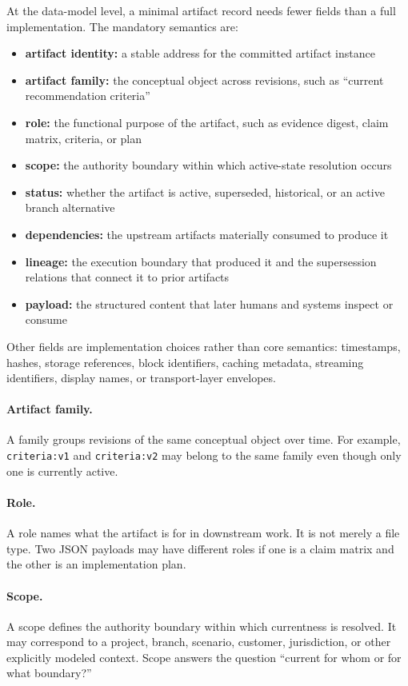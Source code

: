 \documentclass{article}
\begin{document}
At the data-model level, a minimal artifact record needs fewer fields than a full implementation. The mandatory semantics are:
\begin{itemize}
\item \textbf{artifact identity:} a stable address for the committed artifact instance
\item \textbf{artifact family:} the conceptual object across revisions, such as ``current recommendation criteria''
\item \textbf{role:} the functional purpose of the artifact, such as evidence digest, claim matrix, criteria, or plan
\item \textbf{scope:} the authority boundary within which active-state resolution occurs
\item \textbf{status:} whether the artifact is active, superseded, historical, or an active branch alternative
\item \textbf{dependencies:} the upstream artifacts materially consumed to produce it
\item \textbf{lineage:} the execution boundary that produced it and the supersession relations that connect it to prior artifacts
\item \textbf{payload:} the structured content that later humans and systems inspect or consume
\end{itemize}

Other fields are implementation choices rather than core semantics: timestamps, hashes, storage references, block identifiers, caching metadata, streaming identifiers, display names, or transport-layer envelopes.

\paragraph{Artifact family.} A family groups revisions of the same conceptual object over time. For example, \texttt{criteria:v1} and \texttt{criteria:v2} may belong to the same family even though only one is currently active.

\paragraph{Role.} A role names what the artifact is for in downstream work. It is not merely a file type. Two JSON payloads may have different roles if one is a claim matrix and the other is an implementation plan.

\paragraph{Scope.} A scope defines the authority boundary within which currentness is resolved. It may correspond to a project, branch, scenario, customer, jurisdiction, or other explicitly modeled context. Scope answers the question ``current for whom or for what boundary?''
\end{document}
